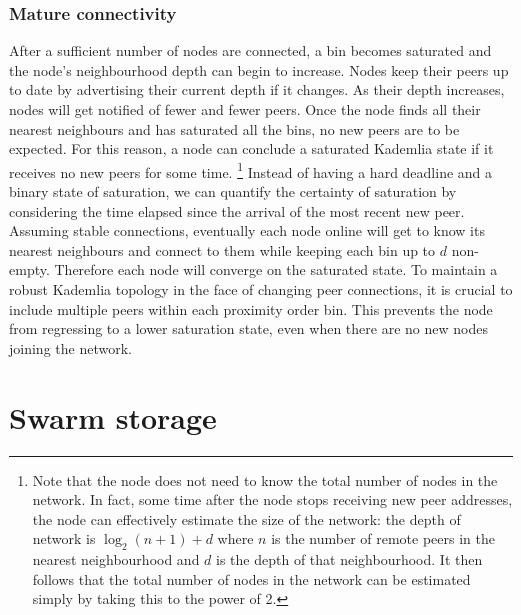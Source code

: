     


\subsubsection{Mature connectivity}

After a sufficient number of nodes are connected, a bin becomes saturated and the node's neighbourhood depth can begin to increase. Nodes keep their peers up to date by advertising their current depth if it changes. As their depth increases, nodes will get notified of fewer and fewer peers. Once the node finds all their nearest neighbours and has saturated all the bins, no new peers are to be expected. For this reason, a node can conclude a saturated Kademlia state if it receives no new peers for some time.%
%
\footnote{Note that the node does not need to know the total number of nodes in the network. In fact, some time after the node stops receiving new peer addresses, the node can effectively estimate the size of the network: the depth of network is $\log_2(n+1)+ d$ where $n$ is the number of remote peers in the nearest neighbourhood and $d$ is the depth of that neighbourhood. It then follows that the total number of nodes in the network can be estimated simply by taking this to the power of 2.}
%
Instead of having a hard deadline and a binary state of saturation, we can quantify the certainty of saturation by considering the time elapsed since the arrival of the most recent new peer. Assuming stable connections, eventually each node online will get to know its nearest neighbours and connect to them while keeping each bin up to $d$ non-empty. Therefore each node will converge on the saturated state. To maintain a robust Kademlia topology in the face of changing peer connections, it is crucial to include multiple peers within each proximity order bin. This prevents the node from regressing to a lower saturation state, even when there are no new nodes joining the network. 

\section{Swarm storage\statusgreen}\label{sec:kademlia-storage}

